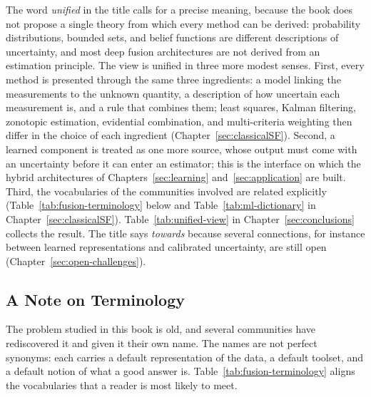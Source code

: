 \documentclass[graybox,envcountchap]{style/SNmono}
\begin{document}
The word \emph{unified} in the title calls for a precise meaning, because the book does not propose a single theory from which every method can be derived: probability distributions, bounded sets, and belief functions are different descriptions of uncertainty, and most deep fusion architectures are not derived from an estimation principle. The view is unified in three more modest senses. First, every method is presented through the same three ingredients: a model linking the measurements to the unknown quantity, a description of how uncertain each measurement is, and a rule that combines them; least squares, Kalman filtering, zonotopic estimation, evidential combination, and multi-criteria weighting then differ in the choice of each ingredient (Chapter~\ref{sec:classicalSF}). Second, a learned component is treated as one more source, whose output must come with an uncertainty before it can enter an estimator; this is the interface on which the hybrid architectures of Chapters~\ref{sec:learning} and~\ref{sec:application} are built. Third, the vocabularies of the communities involved are related explicitly (Table~\ref{tab:fusion-terminology} below and Table~\ref{tab:ml-dictionary} in Chapter~\ref{sec:classicalSF}). Table~\ref{tab:unified-view} in Chapter~\ref{sec:conclusions} collects the result. The title says \emph{towards} because several connections, for instance between learned representations and calibrated uncertainty, are still open (Chapter~\ref{sec:open-challenges}).

\subsection{A Note on Terminology}
\label{subsec:terminology}

The problem studied in this book is old, and several communities have rediscovered it and given it their own name. The names are not perfect synonyms: each carries a default representation of the data, a default toolset, and a default notion of what a good answer is. Table~\ref{tab:fusion-terminology} aligns the vocabularies that a reader is most likely to meet.
\end{document}

